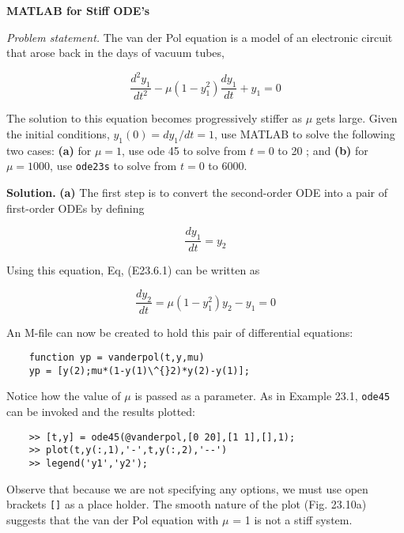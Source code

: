 \documentclass[../main.tex]{subfiles}
\begin{document}
\begin{exmp}
    \textbf{MATLAB for Stiff ODE's}

    \noindent \textit{Problem statement.} The van der Pol equation is a model of an electronic circuit that
    arose back in the days of vacuum tubes,

    \begin{equation}
        \tag{E23.6.1}
        \frac{d^{2} y_{1}}{d t^{2}}-\mu\left(1-y_{1}^{2}\right) \frac{d y_{1}}{d t}+y_{1}=0
    \end{equation}

    The solution to this equation becomes progressively stiffer as $\mu$ gets large. Given the initial conditions, $y_{1}(0)=d y_{1} / d t=1$, use MATLAB to solve the following two cases: \textbf{(a)} for $\mu=1$, use ode 45 to solve from $t=0$ to 20 ; and \textbf{(b)} for $\mu=1000$, use \texttt{ode23s} to solve from $t=0$ to 6000.

    \noindent \textbf{Solution.} \textbf{(a)} The first step is to convert the second-order ODE into a pair of first-order ODEs by defining

    \begin{equation}
        \frac{dy_1}{dt}=y_2 \nonumber
    \end{equation}

    \noindent Using this equation, Eq, (E23.6.1) can be written as

    \begin{equation}
        \frac{d y_{2}}{d t}=\mu\left(1-y_{1}^{2}\right) y_{2}-y_{1}=0 \nonumber 
    \end{equation}

    \noindent An M-file can now be created to hold this pair of differential equations:
    \begin{lstlisting}
    function yp = vanderpol(t,y,mu)
    yp = [y(2);mu*(1-y(1)\^{}2)*y(2)-y(1)];
    \end{lstlisting}
    

    \noindent Notice how the value of $\mu$ is passed as a parameter. As in Example 23.1, \texttt{ode45} can be invoked and the results plotted:
    \begin{lstlisting}
    >> [t,y] = ode45(@vanderpol,[0 20],[1 1],[],1);
    >> plot(t,y(:,1),'-',t,y(:,2),'--')
    >> legend('y1','y2');
    \end{lstlisting}
    

    \noindent Observe that because we are not specifying any options, we must use open brackets \texttt{[]} as
    a place holder. The smooth nature of the plot (Fig. 23.10a) suggests that the van der Pol
    equation with $\mu$ = 1 is not a stiff system.\vspace{1mm}


\end{exmp}
\end{document}

